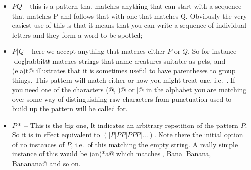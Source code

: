 \begin{itemize}
\item $P Q$ -- this is a pattern that matches anything that can start with
a sequence that matches P and follows that with one that matches Q. Obviously
the very easiest use of this is that it means that you can write a sequence
of individual letters and they form a word to be spotted;
\item $P | Q$ -- here we accept anything that matches either $P$ or $Q$.
So for instance \verb@cat|dog|rabbit@ matches strings that name creatures
suitable as pets, and \verb@p(e|a)t@ illustrates that it is sometimes
useful to have parentheses to group things.
This pattern will match either \verb@pet@ or how you might treat one,
i.e.\ \verb@pat@. If you need one of the characters \verb@(@, \verb@)@
or \verb@|@ in the alphabet you are matching over some way of distinguishing
raw characters from punctuation used to build up the pattern will be
called for.
\item $P*$ -- This is the big one, It indicates an arbitrary repetition
of the pattern $P$. So it is in effect equivalent to $(| P | P P | P P P |
\ldots)$. Note there the initial option of no instances of $P$, i.e.\ of
this matching the empty string. A really simple instance of this would
be \verb@B(an)*a@ which matches \verb@Ba, Bana, Banana, Bananana@ and so on.
\end{itemize}

